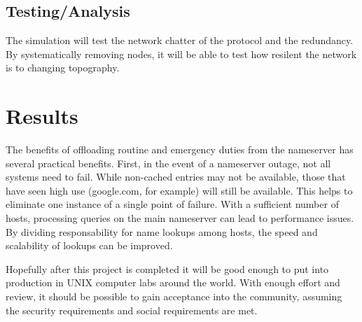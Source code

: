 \documentclass[12pt,letterpaper]{report}
\begin{document}
\section{Testing/Analysis}
The simulation will test the network chatter of the protocol and the redundancy. By systematically removing nodes, it will be able to test how resilent the network is to changing topography.
\chapter{Results}
The benefits of offloading routine and emergency duties from the nameserver has several practical benefits. First, in the event of a nameserver outage, not all systems need to fail. While non-cached entries may not be available, those that have seen high use (google.com, for example) will still be available. This helps to eliminate one instance of a single point of failure. With a sufficient number of hosts, processing queries on the main nameserver can lead to performance issues. By dividing responsability for name lookups among hosts, the speed and scalability of lookups can be improved.

Hopefully after this project is completed it will be good enough to put into production in UNIX computer labs around the world. With enough effort and review, it should be possible to gain acceptance into the community, assuming the security requirements and social requirements are met.
\end{document}
